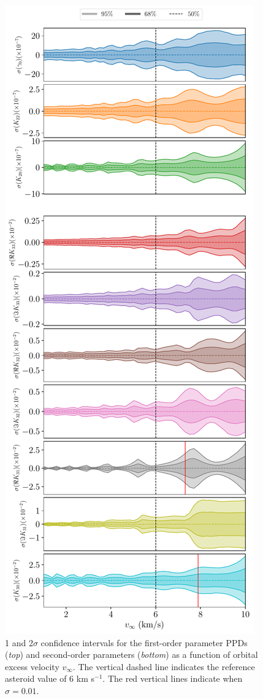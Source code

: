 \documentclass[fleqn,usenatbib]{mnras}
\begin{document}
\begin{figure}
  \centering
  \includegraphics[height=0.89\textheight]{figs/scan-vex.pdf}
  \caption{1 and 2$\sigma$ confidence intervals for the first-order parameter PPDs (\textit{top}) and second-order parameters (\textit{bottom}) as a function of orbital excess velocity $v_\infty$. The vertical dashed line indicates the reference asteroid value of 6 km s$^{-1}$. The red vertical lines indicate when $\sigma = 0.01$.}
  \label{fig:scan-vex}
\end{figure}
\end{document}
